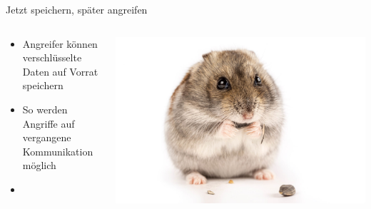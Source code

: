 \begin{frame}[T]{Jetzt speichern, später angreifen}

  \begin{columns}[c]
    \begin{column}{.6\textwidth}
      \begin{itemize}
        \item Angreifer können verschlüsselte Daten auf Vorrat speichern
        \vspace{.8em}
        \item So werden Angriffe auf vergangene Kommunikation möglich
        \vspace{.8em}
        \item {}
      \end{itemize}
    \end{column}

    \begin{column}{.4\textwidth}
      \includegraphics[height=.5\textheight]{graphics/gray-hamster-eating-sunflower-seed.jpeg}
    \end{column}
  \end{columns}

\end{frame}
